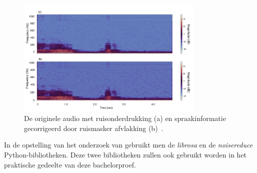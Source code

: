\begin{figure}
    \centering
    \includegraphics[width=0.8\textwidth]{./img/The_original_noise-removed_audio}
    \caption{\label{fig:The_original_noise-removed_audio}De originele audio met ruisonderdrukking (a) en spraakinformatie gecorrigeerd door ruismasker afvlakking (b)~\autocite{Jung2021}.}
\end{figure}

In de opstelling van het onderzoek van \textcite{Jung2021} gebruikt men de \textit{librosa} en de \textit{noisereduce} Python-bibliotheken. Deze twee bibliotheken zullen ook gebruikt worden in het praktische gedeelte van deze bachelorproef.
